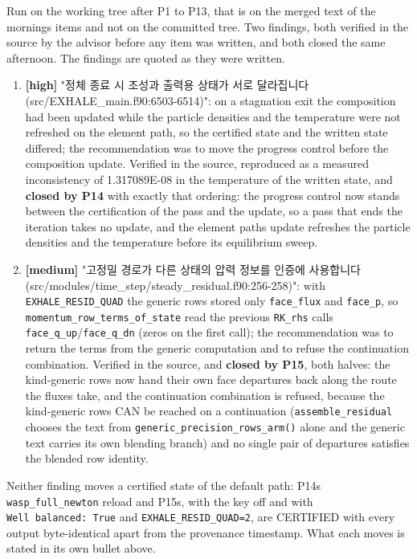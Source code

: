 \documentclass[english,a4paper]{my_memo}
\providecommand{\tightlist}{\setlength{\itemsep}{0pt}\setlength{\parskip}{0pt}}
\begin{document}
Run on the working tree after P1 to P13, that is on the merged text of the
morning\textquotesingle s items and not on the committed tree. Two findings, both verified in
the source by the advisor before any item was written, and both closed the
same afternoon. The findings are quoted as they were written.

\begin{enumerate}
\def\labelenumi{\arabic{enumi}.}
\tightlist
\item
  \textbf{{[}high{]}} "정체 종료 시 조성과 출력용 상태가 서로 달라집니다
  (src/EXHALE\_main.f90:6503-6514)": on a stagnation exit the composition had
  been updated while the particle densities and the temperature were not
  refreshed on the element path, so the certified state and the written state
  differed; the recommendation was to move the progress control before the
  composition update. Verified in the source, reproduced as a measured
  inconsistency of 1.317089E-08 in the temperature of the written state, and
  \textbf{closed by P14} with exactly that ordering: the progress control now
  stands between the certification of the pass and the update, so a pass that
  ends the iteration takes no update, and the element path\textquotesingle s update refreshes
  the particle densities and the temperature before its equilibrium sweep.
\item
  \textbf{{[}medium{]}} "고정밀 경로가 다른 상태의 압력 정보를 인증에 사용합니다
  (src/modules/time\_step/steady\_residual.f90:256-258)": with
  \texttt{EXHALE\_RESID\_QUAD} the generic rows stored only \texttt{face\_flux} and \texttt{face\_p},
  so \texttt{momentum\_row\_terms\_of\_state} read the previous \texttt{RK\_rhs} call\textquotesingle s
  \texttt{face\_q\_up}/\texttt{face\_q\_dn} (zeros on the first call); the recommendation was to
  return the terms from the generic computation and to refuse the continuation
  combination. Verified in the source, and \textbf{closed by P15}, both halves: the
  kind-generic rows now hand their own face departures back along the route the fluxes take,
  and the continuation combination is refused, because the kind-generic rows CAN be
  reached on a continuation (\texttt{assemble\_residual} chooses the text from
  \texttt{generic\_precision\_rows\_arm()} alone and the generic text carries its own
  blending branch) and no single pair of departures satisfies the blended row
  identity.
\end{enumerate}

Neither finding moves a certified state of the default path: P14\textquotesingle s
\texttt{wasp\_full\_newton} reload and P15\textquotesingle s, with the key off and with
\texttt{Well\ balanced:\ True} and \texttt{EXHALE\_RESID\_QUAD=2}, are CERTIFIED with every
output byte-identical apart from the provenance timestamp. What each moves is
stated in its own bullet above.
\end{document}
